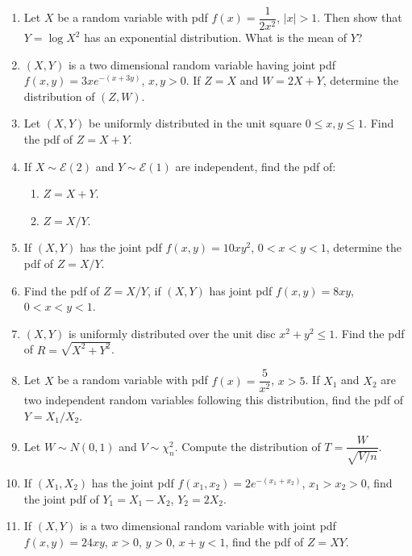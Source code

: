 \documentclass[svgnames]{amsart}
\begin{document}
\begin{enumerate}[leftmargin=*, itemsep=2mm]
\item Let $X$ be a random variable with pdf $f(x) = \dfrac 1 {2x^2}$, $|x| > 1$. Then show that $Y = \log X^2$ has an exponential distribution. What is the mean of $Y$?

\item $(X, Y)$ is a two dimensional random variable having joint pdf $f(x, y) = 3xe^{-(x+3y)}$, $x,y > 0$. If $Z = X$ and $W = 2X + Y$, determine the distribution of $(Z, W)$.

\item Let $(X, Y)$ be uniformly distributed in the unit square $0 \le x, y \le 1$. Find the pdf of $Z = X + Y$.

\item If $X \sim \mathcal E(2)$ and $Y \sim \mathcal E(1)$ are independent, find the pdf of:
\begin{enumerate}
	\item $Z = X + Y$.
	\item $Z = X/Y$.
\end{enumerate}

\item If $(X, Y)$ has the joint pdf $f(x, y) = 10xy^2$, $0 < x < y < 1$, determine the pdf of $Z = X/Y$.

\item Find the pdf of $Z = X/Y$, if $(X, Y)$ has joint pdf $f(x, y) = 8xy$, $0 < x < y < 1$.

\item $(X, Y)$ is uniformly distributed over the unit disc $x^2 + y^2 \le 1$. Find the pdf of $R = \sqrt{X^2 + Y^2}$.

\item Let $X$ be a random variable with pdf $f(x) = \dfrac 5 {x^2}$, $x > 5$. If $X_1$ and $X_2$ are two independent random variables following this distribution, find the pdf of $Y = X_1/X_2$.

\item Let $W \sim N(0, 1)$ and $V \sim \chi^2_n$. Compute the distribution of $T = \dfrac{W}{\sqrt{V/n}}$.

\item If $(X_1, X_2)$ has the joint pdf $f(x_1, x_2) = 2e^{-(x_1 + x_2)}$, $x_1 > x_2 > 0$, find the joint pdf of $Y_1 = X_1 - X_2$, $Y_2 = 2X_2$.

\item If $(X, Y)$ is a two dimensional random variable with joint pdf $f(x, y) = 24 xy$, $x > 0$, $y > 0$, $x + y < 1$, find the pdf of $Z = XY$.

\end{enumerate}
\end{document}

